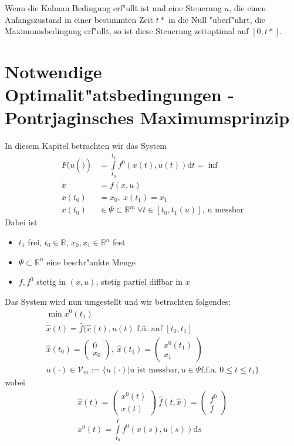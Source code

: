 \documentclass[pdftex,a4paper,oneside]{scrbook}
\begin{document}
Wenn die Kalman Bedingung erf"ullt ist und eine Steuerung $u$, die einen Anfangszustand in einer bestimmten Zeit $t*$ in die Null "uberf"uhrt, die Maximumsbedingung erf"ullt, so ist diese Steuerung zeitoptimal auf $[0,t*]$. 

\section{Notwendige Optimalit"atsbedingungen - Pontrjaginsches Maximumsprinzip} 

In diesem Kapitel betrachten wir das System
\begin{align*}
	F(u(\dot)) & = \int\limits_{t_0}^{t_1} f^0 (x(t), u(t)) \mathrm{d}t = \inf \\
	\dot{x} & = f(x,u) \\
	x(t_0) & = x_0, \: x(t_1) = x_1 \\
	x(t_0) & \in \Psi \subset \mathbb{R}^m \: \forall t \in [t_0, t_1(u)], \: \text{u messbar}  
\end{align*}
Dabei ist 
\begin{itemize}
	\item $t_1$ frei, $t_0 \in \mathbb{R}$, $x_0, x_1 \in \mathbb{R}^n$ fest 
	\item $\Psi \subset \mathbb{R}^n$ eine beschr"ankte Menge
	\item $f, f^0$ stetig in $(x,u)$, stetig partiel diffbar in $x$
\end{itemize}

Das System wird nun umgestellt und wir betrachten folgendes:
\begin{align*}
	\min x^0 (t_1) \\
	\dot{\hat{x}}(t) = \hat{f} (\hat{x}(t), u(t ) \text{ f.ü. auf } [t_0, t_1] \\
	\hat{x}(t_0)  = \begin{pmatrix} 0 \\ x_0 \end{pmatrix}, \: \hat{x}(t_1) = \begin{pmatrix} x^0(t_1) \\ x_1 \end{pmatrix} \\
	u(\cdot) \in \mathcal{V}_m:= \{u(\cdot) | \text{u ist messbar}, u \in \Psi \text{f.f.a. } 0 \le t \le t_1  \} 
\end{align*}
wobei
\begin{align*}
	\hat{x}(t) = \begin{pmatrix} x^0(t) \\ x(t)\end{pmatrix} \: \hat{f}(t,\hat{x}) = \begin{pmatrix} f^0 \\ f \end{pmatrix} \\
	x^0(t) = \int\limits_{t_0}^t f^0(x(s),u(s) ) \mathrm{d}s
\end{align*}
\end{document}

